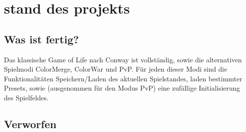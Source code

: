 \documentclass[12pt]{article}
\theoremstyle{plain}
\begin{document}
\section{stand des projekts}
\subsection{Was ist fertig?}
Das klassische Game of Life nach Conway ist vollständig, sowie die alternativen Spielmodi ColorMerge, ColorWar und PvP.
Für jeden dieser Modi sind die Funktionalitäten Speichern/Laden des aktuellen Spielstandes, laden bestimmter Presets, sowie (ausgenommen für den Modus PvP) eine zufällige Initialisierung des Spielfeldes.
\subsection{Verworfen}
\end{document}
